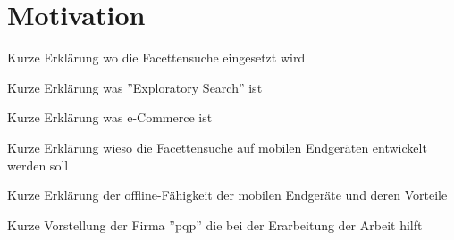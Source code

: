 \section{Motivation}
\label{sec:Einleitung:Motivation}
 Kurze Erklärung wo die Facettensuche eingesetzt wird

 \noindent
 Kurze Erklärung was ''Exploratory Search'' ist

\noindent
 Kurze Erklärung was e-Commerce ist

\noindent
 Kurze Erklärung wieso die Facettensuche auf mobilen Endgeräten entwickelt werden soll

 \noindent
 Kurze Erklärung der offline-Fähigkeit der mobilen Endgeräte und deren Vorteile

 \noindent
 Kurze Vorstellung der Firma ''pqp'' die bei der Erarbeitung der Arbeit hilft